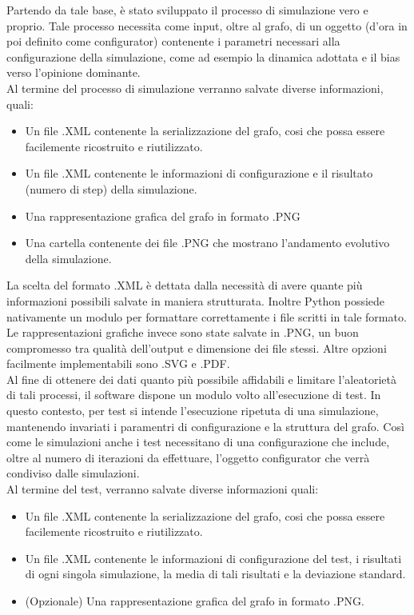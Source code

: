 \documentclass{article}
\begin{document}
Partendo da tale base, è stato sviluppato il processo di simulazione vero e proprio. Tale processo necessita come input, oltre al grafo, di un oggetto (d'ora in poi definito come configurator) contenente i parametri necessari alla configurazione della simulazione, come ad esempio la dinamica adottata e il bias verso l'opinione dominante.\\ 
Al termine del processo di simulazione verranno salvate diverse informazioni, quali:
\begin{itemize}
\item Un file .XML contenente la serializzazione del grafo, cosi che possa essere facilemente ricostruito e riutilizzato.
\item Un file .XML contenente le informazioni di configurazione e il risultato (numero di step) della             simulazione.
\item Una rappresentazione grafica del grafo in formato .PNG
\item Una cartella contenente dei file .PNG che mostrano l'andamento evolutivo della simulazione.
\end{itemize}
La scelta del formato .XML è dettata dalla necessità di avere quante più informazioni possibili salvate in maniera strutturata. Inoltre Python possiede nativamente un modulo per formattare correttamente i file scritti in tale formato.
Le rappresentazioni grafiche invece sono state salvate in .PNG, un buon compromesso tra qualità dell'output e dimensione dei file stessi. Altre opzioni facilmente implementabili sono .SVG e .PDF.\\
Al fine di ottenere dei dati quanto più possibile affidabili e limitare l'aleatorietà di tali processi, il software dispone un modulo volto all'esecuzione di test. In questo contesto, per test si intende l'esecuzione ripetuta di una simulazione, mantenendo invariati i paramentri di configurazione e la struttura del grafo. Così come le simulazioni anche i test necessitano di una configurazione che include, oltre al numero di iterazioni da effettuare, l'oggetto configurator che verrà condiviso dalle simulazioni.\\
Al termine del test, verranno salvate diverse informazioni quali:
\begin{itemize}
\item Un file .XML contenente la serializzazione del grafo, cosi che possa essere facilemente ricostruito e riutilizzato.
\item Un file .XML contenente le informazioni di configurazione del test, i risultati di ogni singola simulazione, la media di tali risultati e la deviazione standard.
\item (Opzionale) Una rappresentazione grafica del grafo in formato .PNG.
\end{itemize}
\end{document}
